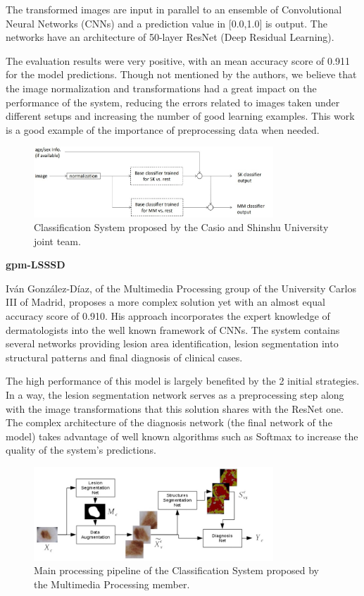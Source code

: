 \documentclass[10pt]{IEEEtran}
\begin{document}
The transformed images are input in parallel to an ensemble of Convolutional Neural Networks (CNNs) and a prediction value in [0.0,1.0] is output.
The networks have an architecture of 50-layer ResNet (Deep Residual Learning).

The evaluation results were very positive, with an mean accuracy score of 0.911 for the model predictions. 
Though not mentioned by the authors, we believe that the image normalization and transformations had a great impact on the performance of the system, reducing the errors related to images taken under different setups and increasing the number of good learning examples.
This work is a good example of the importance of preprocessing data when needed.

\begin{figure}[H]
\centering
\includegraphics[width=9cm]{ISIC_1stPlace_ClassificationSystem.jpg}
\caption{Classification System proposed by the Casio and Shinshu University joint team.}
\end{figure}

\textbf{gpm-LSSSD}

Iván González-Díaz, of the Multimedia Processing group of the University Carlos III of Madrid, proposes a more complex solution yet with an almost equal accuracy score of 0.910.
His approach incorporates the expert knowledge of dermatologists into the well known framework of CNNs. 
The system contains several networks providing lesion area identification, lesion segmentation into structural patterns and final diagnosis of clinical cases.

The high performance of this model is largely benefited by the 2 initial strategies. 
In a way, the lesion segmentation network serves as a preprocessing step along with the image transformations that this solution shares with the ResNet one. 
The complex architecture of the diagnosis network (the final network of the model) takes advantage of well known algorithms such as Softmax to increase the quality of the system's predictions.

\begin{figure}[H]
\centering
\includegraphics[width=9cm]{ISIC_2ndPlace_ClassificationSystem.jpg}
\caption{Main processing pipeline of the Classification System proposed by the Multimedia Processing member.}
\end{figure}
\newpage{}
\end{document}
